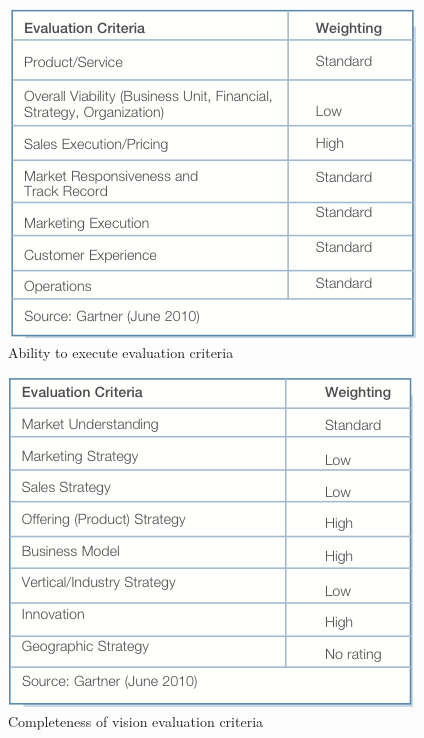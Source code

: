 \begin{figure}
\centering
\includegraphics{img/MQPPMToolsAbilityExecute.png}
\caption{Ability to execute evaluation criteria}
\end{figure}

\begin{figure}
\centering
\includegraphics{img/MQPPMToolsCompletess.png}
\caption{Completeness of vision evaluation criteria}
\end{figure}

